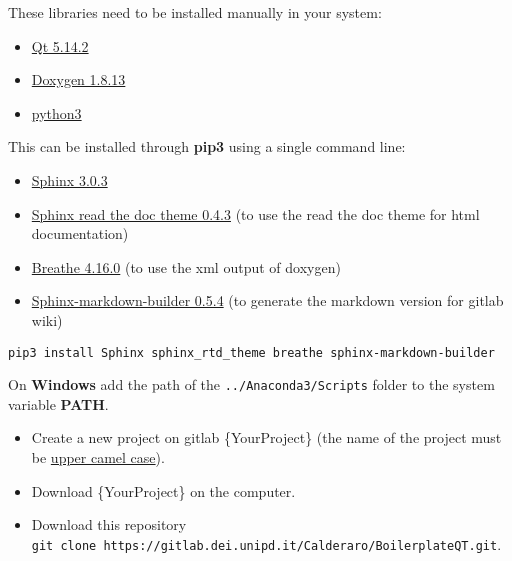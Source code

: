 
These libraries need to be installed manually in your system:

\begin{itemize}
  \item
        \href{https://www.qt.io/}{Qt 5.14.2}
  \item
        \href{http://www.doxygen.nl/download.html}{Doxygen 1.8.13}
  \item
        \href{https://www.anaconda.com/products/individual}{python3}
\end{itemize}

This can be installed through \textbf{pip3} using a single command line:

\begin{itemize}
  \item
        \href{https://pypi.org/project/Sphinx/}{Sphinx 3.0.3}
  \item
        \href{https://sphinx-rtd-theme.readthedocs.io/en/stable/}{Sphinx read
          the doc theme 0.4.3} (to use the read the doc theme for html
        documentation)
  \item
        \href{https://pypi.org/project/breathe/}{Breathe 4.16.0} (to use the
        xml output of doxygen)
  \item
        \href{https://pypi.org/project/sphinx-markdown-builder/}{Sphinx-markdown-builder
          0.5.4} (to generate the markdown version for gitlab wiki)
\end{itemize}

\texttt{pip3\ install\ Sphinx\ sphinx\_rtd\_theme\ breathe\ sphinx-markdown-builder}

On \textbf{Windows} add the path of the \texttt{../Anaconda3/Scripts} folder to the system variable \textbf{PATH}.


\begin{itemize}
  \item
        Create a new project on gitlab \{YourProject\} (the name of the
        project must be \href{https://en.wikipedia.org/wiki/Camel_case}{upper
          camel case}).
\end{itemize}

\begin{itemize}
  \item
        Download \{YourProject\} on the computer.
\end{itemize}

\begin{itemize}
  \item
        Download this repository
        \texttt{git\ clone\ https://gitlab.dei.unipd.it/Calderaro/BoilerplateQT.git}.
\end{itemize}

